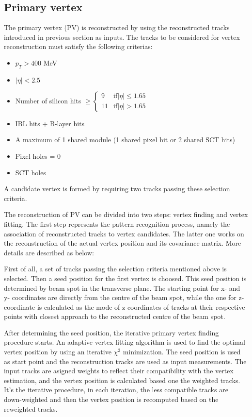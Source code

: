 \subsection{Primary vertex}

The primary vertex (PV) is reconstructed by using the reconstructed tracks introduced in previous section as inputs.
The tracks to be considered for vertex reconstruction must satisfy the following criterias\cite{ATL-PHYS-PUB-2015-026}:
\begin{itemize}
	\item $p_{T} > 400$ MeV
	\item $|\eta| < 2.5$
	\item Number of silicon hits 
$\geq 
\begin{cases}
9&  \text{if} |\eta|\leq1.65\\
11& \text{if} |\eta|>1.65
\end{cases}$
	\item IBL hits + B-layer hits 
	\item A maximum of 1 shared module (1 shared pixel hit or 2 shared SCT hits)
	\item Pixel holes = 0
	\item SCT holes 
\end{itemize}
A candidate vertex is formed by requiring two tracks passing these selection criteria.

The reconstruction of PV can be divided into two steps\cite{Aaboud:2016rmg}: vertex finding and vertex fitting.
The first step represents the pattern recognition process, namely the association of reconstructed tracks to vertex candidates.
The latter one works on the reconstruction of the actual vertex position and its covariance matrix.
More details are described as below:

First of all, a set of tracks passing the selection criteria mentioned above is selected.
Then a seed position for the first vertex is choosed.
This seed position is determined by beam spot in the transverse plane.
The starting point for x- and y- coordinates are directly from the centre of the beam spot,
while the one for z-coordinate is calculated as the mode of z-coordinates of tracks at their respective points with closest approach to the reconstructed centre of the beam spot. 

After determining the seed position, the iterative primary vertex finding procedure starts.
An adaptive vertex fitting algorithm is used to find the optimal vertex position by using an iterative $\chi^{2}$ minimization.
The seed position is used as start point and the reconstruction tracks are used as input measurements.
The input tracks are asigned weights to reflect their compatibility with the vertex estimation, and the vertex position is calculated based one the weighted tracks.
It's the iterative procedure, in each iteration, the less compatible tracks are down-weighted and then the vertex position is recomputed based on the reweighted tracks.

